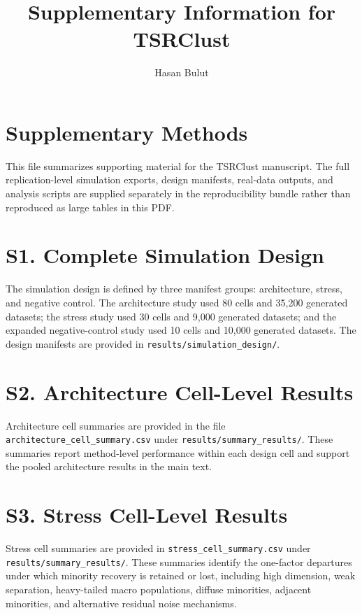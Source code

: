 \documentclass[pdflatex,sn-nature]{sn-jnl}
\begin{document}
\title{Supplementary Information for TSRClust}
\author{Hasan Bulut}
\maketitle

\section*{Supplementary Methods}

This file summarizes supporting material for the TSRClust manuscript. The full
replication-level simulation exports, design manifests, real-data outputs, and
analysis scripts are supplied separately in the reproducibility bundle rather
than reproduced as large tables in this PDF.

\section*{S1. Complete Simulation Design}

The simulation design is defined by three manifest groups: architecture,
stress, and negative control. The architecture study used 80 cells and 35,200
generated datasets; the stress study used 30 cells and 9,000 generated
datasets; and the expanded negative-control study used 10 cells and 10,000
generated datasets. The design manifests are provided in
\texttt{results/simulation\_design/}.

\section*{S2. Architecture Cell-Level Results}

Architecture cell summaries are provided in the file
\texttt{architecture\_cell\_summary.csv} under
\texttt{results/summary\_results/}. These
summaries report method-level performance within each design cell and support
the pooled architecture results in the main text.

\section*{S3. Stress Cell-Level Results}

Stress cell summaries are provided in \texttt{stress\_cell\_summary.csv} under
\texttt{results/summary\_results/}. These summaries
identify the one-factor departures under which minority recovery is retained or
lost, including high dimension, weak separation, heavy-tailed macro
populations, diffuse minorities, adjacent minorities, and alternative residual
noise mechanisms.
\end{document}

